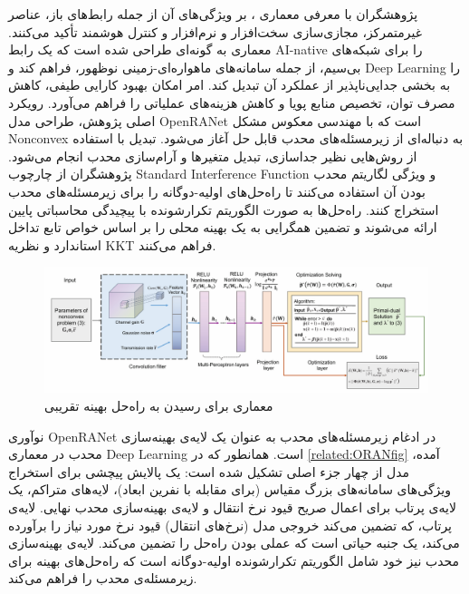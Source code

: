 پژوهشگران با معرفی معماری 
،
 بر ویژگی‌های آن از جمله رابط‌های باز، عناصر غیرمتمرکز، مجازی‌سازی سخت‌افزار و نرم‌افزار و کنترل هوشمند تأکید می‌کنند.  معماری به گونه‌ای طراحی شده است که یک رابط AI-native را برای شبکه‌های بی‌سیم، از جمله سامانه‌های ماهواره‌ای-زمینی نوظهور، فراهم کند و 
\gls{Deep Learning}
را به بخشی جدایی‌ناپذیر از عملکرد آن تبدیل کند.  امر امکان بهبود کارایی طیفی، کاهش مصرف توان، تخصیص منابع پویا و کاهش هزینه‌های عملیاتی را فراهم می‌آورد.
رویکرد اصلی پژوهش، طراحی مدل OpenRANet است که با مهندسی معکوس مشکل 
\gls{Nonconvex}
به دنباله‌ای از زیرمسئله‌های محدب قابل حل آغاز می‌شود.  تبدیل با استفاده از روش‌هایی نظیر جداسازی، تبدیل متغیرها و آرام‌سازی محدب انجام می‌شود. پژوهشگران از چارچوب 
\gls{Standard Interference Function}
و ویژگی لگاریتم محدب بودن آن استفاده می‌کنند تا راه‌حل‌های اولیه-دوگانه را برای  زیرمسئله‌های محدب استخراج کنند. راه‌حل‌ها به صورت الگوریتم تکرارشونده با پیچیدگی محاسباتی پایین ارائه می‌شوند و تضمین همگرایی به یک بهینه محلی را بر اساس خواص تابع تداخل استاندارد و نظریه 
\gls{KKT}
فراهم می‌کنند.
\begin{figure}
	\centering
	\includegraphics[width=0.9\linewidth]{./Pic/ORAN_related_fig}
	\caption[ معماری  برای رسیدن به راه‌حل بهینه تقریبی]{معماری  برای رسیدن به راه‌حل بهینه تقریبی \cite{OpenRANet}}
	\label{related:ORANfig}
\end{figure}
نوآوری OpenRANet در ادغام زیرمسئله‌های محدب به عنوان یک لایه‌ی بهینه‌سازی محدب در معماری 
\gls{Deep Learning}
است. همانطور که در
\autoref{related:ORANfig}
 آمده، مدل از چهار جزء اصلی تشکیل شده است: یک پالایش پیچشی برای استخراج ویژگی‌های سامانه‌های بزرگ ‌مقیاس (برای مقابله با نفرین ابعاد)، لایه‌های متراکم، یک لایه‌ی پرتاب برای اعمال صریح قیود نرخ انتقال و لایه‌ی بهینه‌سازی محدب نهایی. لایه‌ی پرتاب، که تضمین می‌کند خروجی مدل (نرخ‌های انتقال) قیود نرخ مورد نیاز را برآورده می‌کند، یک جنبه حیاتی است که عملی بودن راه‌حل را تضمین می‌کند. لایه‌ی بهینه‌سازی محدب نیز خود شامل الگوریتم تکرارشونده اولیه-دوگانه است که راه‌حل‌های بهینه برای زیرمسئله‌ی محدب را فراهم می‌کند.

